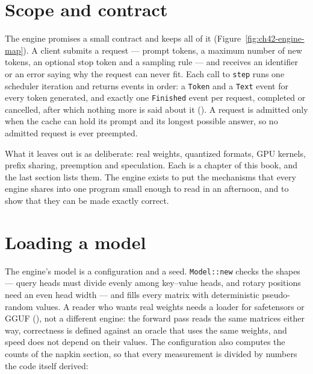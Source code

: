 \section{Scope and contract}

The engine promises a small contract and keeps all of it
(Figure~\ref{fig:ch42-engine-map}). A client submits a request --- prompt
tokens, a maximum number of new tokens, an optional stop token and a sampling
rule --- and receives an identifier or an error saying why the request can never
fit. Each call to \texttt{step} runs one scheduler iteration and returns events
in order: a \texttt{Token} and a \texttt{Text} event for every token generated,
and exactly one \texttt{Finished} event per request, completed or cancelled,
after which nothing more is said about it (). A
request is admitted only when the cache can hold its prompt and its longest
possible answer, so no admitted request is ever preempted.


What it leaves out is as deliberate: real weights, quantized formats, GPU
kernels, prefix sharing, preemption and speculation. Each is a chapter of this
book, and the last section lists them. The engine exists to put the mechanisms
that every engine shares into one program small enough to read in an afternoon,
and to show that they can be made exactly correct.

\section{Loading a model}

The engine's model is a configuration and a seed. \texttt{Model::new} checks the
shapes --- query heads must divide evenly among key--value heads, and rotary
positions need an even head width --- and fills every matrix with deterministic
pseudo-random values. A reader who wants real weights needs a loader for
safetensors or GGUF (), not a different engine: the
forward pass reads the same matrices either way, correctness is defined against
an oracle that uses the same weights, and speed does not depend on their values.
The configuration also computes the counts of the napkin section, so that every
measurement is divided by numbers the code itself derived:


